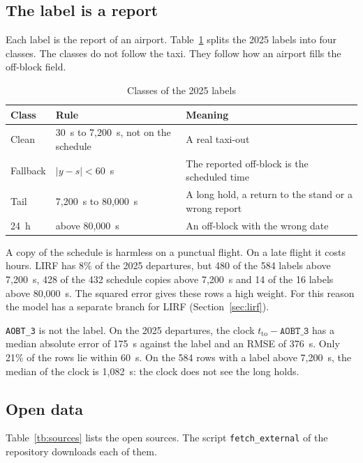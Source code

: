 \documentclass[
  manuscript=article,
  layout=preprint,
  year=2026,
  volume=x,
]{extra/joas}
\begin{document}
\subsection{The label is a report}

Each label is the report of an airport. Table~\ref{tb:classes} splits the 2025 labels into four classes. The classes do not follow the taxi. They follow how an airport fills the off-block field.

\begin{table}[htbp!]
  \centering
  \small
  \caption{Classes of the 2025 labels}
  \label{tb:classes}
  \begin{tabular}{lll}
  \toprule
  \textbf{Class} & \textbf{Rule} & \textbf{Meaning} \\
  \midrule
  Clean & 30~s to 7,200~s, not on the schedule & A real taxi-out \\
  Fallback & $|y - s| < 60$~s & The reported off-block is the scheduled time \\
  Tail & 7,200~s to 80,000~s & A long hold, a return to the stand or a wrong report \\
  24~h & above 80,000~s & An off-block with the wrong date \\
  \bottomrule
  \end{tabular}
\end{table}

A copy of the schedule is harmless on a punctual flight. On a late flight it costs hours. LIRF has 8\% of the 2025 departures, but 480 of the 584 labels above 7,200~s, 428 of the 432 schedule copies above 7,200~s and 14 of the 16 labels above 80,000~s. The squared error gives these rows a high weight. For this reason the model has a separate branch for LIRF (Section~\ref{sec:lirf}).

\texttt{AOBT\_3} is not the label. On the 2025 departures, the clock $t_{\mathrm{to}} - \texttt{AOBT\_3}$ has a median absolute error of 175~s against the label and an RMSE of 376~s. Only 21\% of the rows lie within 60~s. On the 584 rows with a label above 7,200~s, the median of the clock is 1,082~s: the clock does not see the long holds.

\subsection{Open data}

Table~\ref{tb:sources} lists the open sources. The script \texttt{fetch\_external} of the repository downloads each of them.
\end{document}
